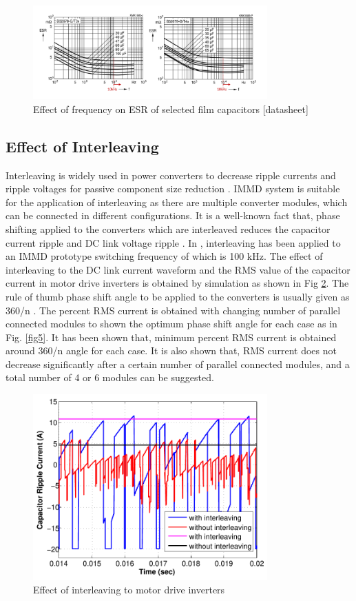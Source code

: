 \documentclass[conference,a4paper,twocolumn]{IEEEtran}
\begin{document}
\begin{figure}[h]
  \centering
  \includegraphics[width=9cm]{esr}
  \caption{Effect of frequency on ESR of selected film capacitors [datasheet]}
  \label{esr}
\end{figure}


\subsection{Effect of Interleaving}

Interleaving is widely used in power converters to decrease ripple currents and ripple voltages for passive component size reduction \cite{Zhang2010}. IMMD system is suitable for the application of interleaving as there are multiple converter modules, which can be connected in different configurations. It is a well-known fact that, phase shifting applied to the converters which are interleaved reduces the capacitor current ripple and DC link voltage ripple \cite{LoCalzo2016,Wang2015b,Su2010}. In \cite{Wang2015b}, interleaving has been applied to an IMMD prototype switching frequency of which is 100 kHz. The effect of interleaving to the DC link current waveform and the RMS value of the capacitor current in motor drive inverters is obtained by simulation as shown in Fig \ref{fig4}.
The rule of thumb phase shift angle to be applied to the converters is usually given as 360/n \cite{LoCalzo2016}. The percent RMS current is obtained with changing number of parallel connected modules to shown the optimum phase shift angle for each case as in Fig. \ref{fig5}. It has been shown that, minimum percent RMS current is obtained around 360/n angle for each case. It is also shown that, RMS current does not decrease significantly after a certain number of parallel connected modules, and a total number of 4 or 6 modules can be suggested.


\begin{figure}[h]
  \centering
  \includegraphics[width=9cm]{fig4_2}
  \caption{Effect of interleaving to motor drive inverters}
  \label{fig4}
\end{figure}
\end{document}
